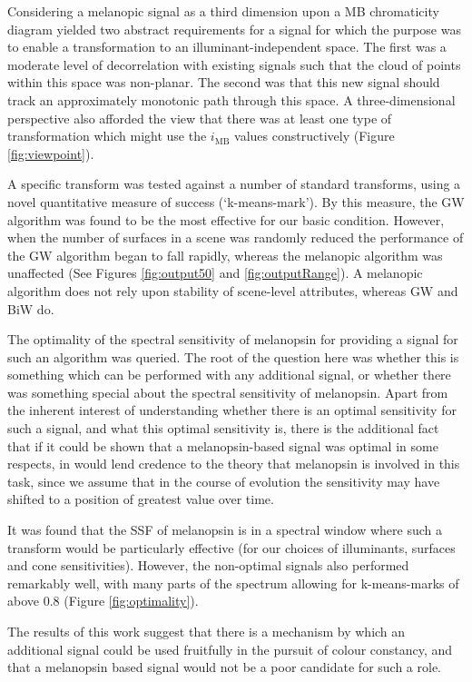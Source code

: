 Considering a melanopic signal as a third dimension upon a \gls{MB} chromaticity diagram yielded two abstract requirements for a signal for which the purpose was to enable a transformation to an illuminant-independent space. The first was a moderate level of decorrelation with existing signals such that the cloud of points within this space was non-planar. The second was that this new signal should track an approximately monotonic path through this space. A three-dimensional perspective also afforded the view that there was at least one type of transformation which might use the $i_{\text{MB}}$ values constructively (Figure \ref{fig:viewpoint}).

A specific transform was tested against a number of standard transforms, using a novel quantitative measure of success (`k-means-mark'). By this measure, the \gls{GW} algorithm was found to be the most effective for our basic condition. However, when the number of surfaces in a scene was randomly reduced the performance of the \gls{GW} algorithm began to fall rapidly, whereas the melanopic algorithm was unaffected (See Figures \ref{fig:output50} and \ref{fig:outputRange}). A melanopic algorithm does not rely upon stability of scene-level attributes, whereas \gls{GW} and \gls{BiW} do.

The optimality of the spectral sensitivity of melanopsin for providing a signal for such an algorithm was queried. The root of the question here was whether this is something which can be performed with any additional signal, or whether there was something special about the spectral sensitivity of melanopsin. Apart from the inherent interest of understanding whether there is an optimal sensitivity for such a signal, and what this optimal sensitivity is, there is the additional fact that if it could be shown that a melanopsin-based signal was optimal in some respects, in would lend credence to the theory that melanopsin is involved in this task, since we assume that in the course of evolution the sensitivity may have shifted to a position of greatest value over time.

It was found that the \gls{SSF} of melanopsin is in a spectral window where such a transform would be particularly effective (for our choices of illuminants, surfaces and cone sensitivities). However, the non-optimal signals also performed remarkably well, with many parts of the spectrum allowing for k-means-marks of above 0.8 (Figure \ref{fig:optimality}). 

The results of this work suggest that there is a mechanism by which an additional signal could be used fruitfully in the pursuit of colour constancy, and that a melanopsin based signal would not be a poor candidate for such a role.

